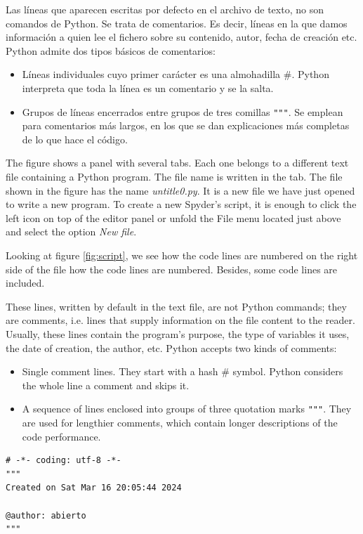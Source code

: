 \begin{paracol}{2}
Las líneas que aparecen escritas por defecto en el archivo de texto, no son comandos de Python. Se trata de comentarios. Es decir, líneas en la que damos información a quien lee el fichero sobre su contenido, autor, fecha de creación etc. Python admite dos tipos básicos de comentarios:
\begin{itemize}
    \item Líneas individuales cuyo primer carácter es una almohadilla \#. Python interpreta que toda la línea es un comentario y se la salta.
    \item Grupos de líneas encerrados entre grupos de tres comillas \verb|"""|. Se emplean para comentarios más largos, en los que se dan explicaciones más completas de lo que hace el código.
\end{itemize}
\switchcolumn
The figure shows a panel with several tabs. Each one belongs to a different text file containing a Python program. The file name is written in the tab. The file shown in the figure has the name \emph{untitle0.py}. It is a new file we have just opened to write a new program. To create a new Spyder's script, it is enough to click the left icon on top of the editor panel or unfold the File menu located just above and select the option \emph{New file}.

Looking at figure \ref{fig:script}, we see how the code lines are numbered on the right side of the file how the code lines are numbered. Besides, some code lines are included.

These lines, written by default in the text file, are not Python commands; they are comments, i.e. lines that supply information on the file content to the reader. Usually, these lines contain the program's purpose, the type of variables it uses, the date of creation, the author, etc. Python accepts two kinds of comments:
\begin{itemize}
    \item Single comment lines. They start with a hash \#  symbol. Python considers the whole line a comment and skips it.
    \item A sequence of lines enclosed into groups of three quotation marks \verb|"""|. They are used for lengthier comments, which contain longer descriptions of the code performance. 
\end{itemize}
\end{paracol}


\begin{verbatim}
# -*- coding: utf-8 -*-
"""
Created on Sat Mar 16 20:05:44 2024

@author: abierto
"""
\end{verbatim}

